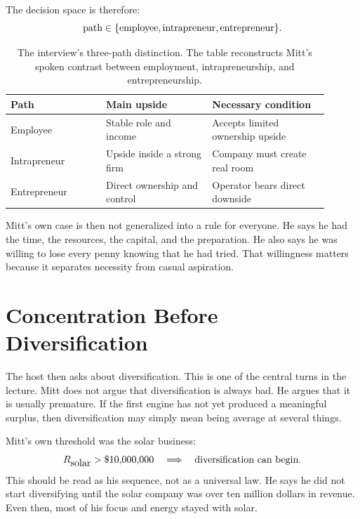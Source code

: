 The decision space is therefore:
\begin{equation}
  \hbox{path}
  \in
  \{\hbox{employee},\hbox{intrapreneur},\hbox{entrepreneur}\}.
\end{equation}

\begin{table}
\centering
\begin{tabular}{p{0.27\linewidth}p{0.30\linewidth}p{0.33\linewidth}}
\hline
Path & Main upside & Necessary condition \\
\hline
Employee &
Stable role and income &
Accepts limited ownership upside \\
Intrapreneur &
Upside inside a strong firm &
Company must create real room \\
Entrepreneur &
Direct ownership and control &
Operator bears direct downside \\
\hline
\end{tabular}
\caption{The interview's three-path distinction. The table reconstructs Mitt's spoken contrast between employment, intrapreneurship, and entrepreneurship.}
\end{table}

Mitt's own case is then not generalized into a rule for everyone. He says he had the time, the resources, the capital, and the preparation. He also says he was willing to lose every penny knowing that he had tried. That willingness matters because it separates necessity from casual aspiration.

\section{Concentration Before Diversification}

The host then asks about diversification. This is one of the central turns in the lecture. Mitt does not argue that diversification is always bad. He argues that it is usually premature. If the first engine has not yet produced a meaningful surplus, then diversification may simply mean being average at several things.

Mitt's own threshold was the solar business:
\begin{equation}
  R_{\hbox{solar}}>\$10{,}000{,}000
  \quad\Longrightarrow\quad
  \hbox{diversification can begin}.
\end{equation}
This should be read as his sequence, not as a universal law. He says he did not start diversifying until the solar company was over ten million dollars in revenue. Even then, most of his focus and energy stayed with solar.

